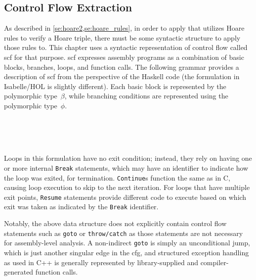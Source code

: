 \subsection{Control Flow Extraction}\label{sse:cfg_extract}
As described in \cref{se:hoare2,se:hoare_rules},
in order to apply  that utilizes Hoare rules to verify a Hoare triple,%
%
there must be some syntactic structure to apply those rules to.
This chapter uses a syntactic representation of control flow called \ac{scf}
for that purpose.
\Ac{scf} expresses assembly programs as a combination of basic blocks,
branches, loops, and function calls.
The following grammar provides a description of \ac{scf}
from the perspective of the Haskell code%
(the formulation in Isabelle/HOL is slightly different).%
Each basic block is represented by the polymorphic type~$\beta$,%
while branching conditions are represented using the polymorphic type~$\phi$.%
\begin{bnf}
   \\
   \\
   \\
\end{bnf}
Loops in this formulation have no exit condition;%
instead, they rely on having one or more internal \texttt{Break} statements,%
which may have an identifier to indicate how the loop was exited, for termination.
\texttt{Continue}s function the same as in C,%
causing loop execution to skip to the next iteration.
For loops that have multiple exit points,
\texttt{Resume} statements provide different code to execute
based on which exit was taken as indicated by the \texttt{Break} identifier.

Notably, the above data structure does not explicitly contain
control flow statements such as \texttt{goto} or \texttt{throw/catch}
as those statements are not necessary for assembly-level analysis.
A non-indirect \texttt{goto} is simply an unconditional jump,
which is just another singular edge in the \ac{cfg},
and structured exception handling as used in C++ is generally represented
by library-supplied and compiler-generated function calls.

